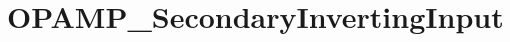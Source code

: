 \hypertarget{group___o_p_a_m_p___secondary_inverting_input}{\section{O\-P\-A\-M\-P\-\_\-\-Secondary\-Inverting\-Input}
\label{group___o_p_a_m_p___secondary_inverting_input}
}
